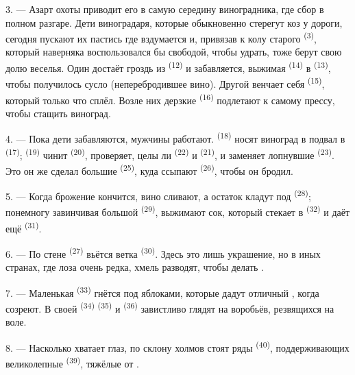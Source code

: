 3. --- Азарт охоты приводит его в самую середину виноградника, где сбор в
полном разгаре. Дети виноградаря, которые обыкновенно стерегут коз у
дороги, сегодня пускают их пастись где вздумается и, привязав к колу
старого  \textsuperscript{(3)}, который наверняка воспользовался бы
свободой, чтобы удрать, тоже берут свою долю веселья. Один достаёт гроздь
из  \textsuperscript{(12)} и забавляется, выжимая
 \textsuperscript{(14)} в  \textsuperscript{(13)}, чтобы
получилось сусло (неперебродившее вино). Другой венчает себя
 \textsuperscript{(15)}, который только что сплёл. Возле
них дерзкие  \textsuperscript{(16)} подлетают к самому прессу,
чтобы стащить виноград.

4. --- Пока дети забавляются, мужчины работают. 
\textsuperscript{(18)} носят виноград в подвал в 
\textsuperscript{(17)};  \textsuperscript{(19)} чинит 
\textsuperscript{(20)}, проверяет, целы ли  \textsuperscript{(22)} и
 \textsuperscript{(21)}, и заменяет лопнувшие 
\textsuperscript{(23)}. Это он же сделал большие  \textsuperscript{(25)},
куда ссыпают  \textsuperscript{(26)}, чтобы он бродил.

5. --- Когда брожение кончится, вино сливают, а остаток кладут под
 \textsuperscript{(28)}; понемногу завинчивая большой 
\textsuperscript{(29)}, выжимают сок, который стекает в 
\textsuperscript{(32)} и даёт ещё  \textsuperscript{(31)}.

\VUsaut{6.0mm}
\VUsaut{3.4mm}

6. --- По стене  \textsuperscript{(27)} вьётся ветка
 \textsuperscript{(30)}. Здесь это лишь украшение, но в иных
странах, где лоза очень редка, хмель разводят, чтобы делать .

7. --- Маленькая  \textsuperscript{(33)} гнётся под яблоками,
которые дадут отличный , когда созреют. В своей 
\textsuperscript{(34)}  \textsuperscript{(35)} и 
\textsuperscript{(36)} завистливо глядят на воробьёв, резвящихся на воле.

8. --- Насколько хватает глаз, по склону холмов стоят ряды
 \textsuperscript{(40)}, поддерживающих великолепные 
\textsuperscript{(39)}, тяжёлые от .


